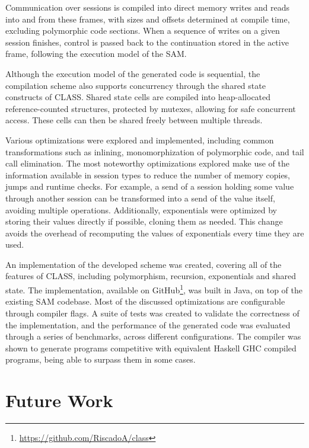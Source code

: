 Communication over sessions is compiled into direct memory writes and reads into and from these frames, with sizes and offsets determined at compile time, excluding polymorphic code sections. When a sequence of writes on a given session finishes, control is passed back to the continuation stored in the active frame, following the execution model of the \ac{SAM}.

Although the execution model of the generated code is sequential, the compilation scheme also supports concurrency through the shared state constructs of \ac{CLASS}. Shared state cells are compiled into heap-allocated reference-counted structures, protected by mutexes, allowing for safe concurrent access. These cells can then be shared freely between multiple threads.

Various optimizations were explored and implemented, including common transformations such as inlining, monomorphization of polymorphic code, and tail call elimination. The most noteworthy optimizations explored make use of the information available in session types to reduce the number of memory copies, jumps and runtime checks. For example, a send of a session holding some value through another session can be transformed into a send of the value itself, avoiding multiple operations. Additionally, exponentials were optimized by storing their values directly if possible, cloning them as needed. This change avoids the overhead of recomputing the values of exponentials every time they are used.

An implementation of the developed scheme was created, covering all of the features of \ac{CLASS}, including polymorphism, recursion, exponentials and shared state. The implementation, available on GitHub\footnote{\url{https://github.com/RiscadoA/class}}, was built in Java, on top of the existing \ac{SAM} codebase. Most of the discussed optimizations are configurable through compiler flags. A suite of tests was created to validate the correctness of the implementation, and the performance of the generated code was evaluated through a series of benchmarks, across different configurations. The compiler was shown to generate programs competitive with equivalent Haskell GHC compiled programs, being able to surpass them in some cases.

\section{Future Work}

